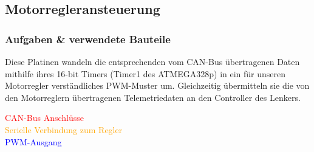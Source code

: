 

\clearpage
\subsection{Motorregleransteuerung\label{sec:Motorregleransteuerung}}
\subsubsection{Aufgaben \& verwendete Bauteile}
Diese Platinen wandeln die entsprechenden vom CAN-Bus übertragenen Daten mithilfe ihres 16-bit Timers (Timer1 des ATMEGA328p) in ein für unseren Motorregler verständliches PWM-Muster um.
Gleichzeitig übermitteln sie die von den Motorreglern übertragenen Telemetriedaten an den Controller des Lenkers.

\begin{minipage}{8.5cm}
\end{minipage}
\begin{minipage}{7cm}
    \textcolor{red}{CAN-Bus Anschlüsse}\\
    \textcolor{orange}{Serielle Verbindung zum Regler}\\
    \textcolor{blue}{PWM-Ausgang}\\

\end{minipage}


